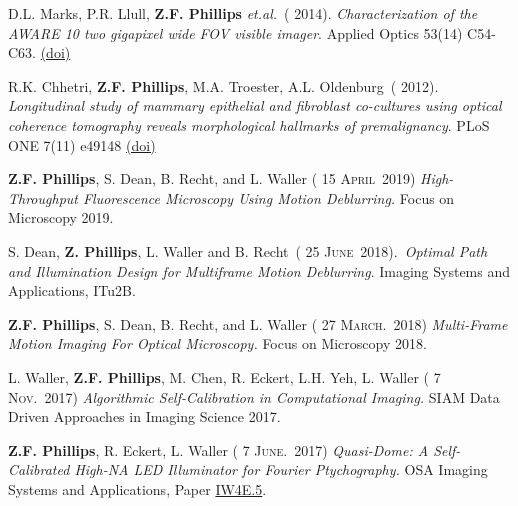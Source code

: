 \documentclass[12pt,letterpaper]{article}
\newcommand{\mhead}[1]{\leavevmode\marginpar{\sffamily\footnotesize #1}}
\renewcommand{\date}[1]{{} #1}
\begin{document}
\medskip
\par D.L. Marks, P.R. Llull, \textbf{Z.F. Phillips} \textit{et.al.}~(\date{2014}).
\emph{Characterization of the AWARE 10 two gigapixel wide FOV visible imager}.
Applied Optics 53(14) C54-C63.  \href{https://www.osapublishing.org/ao/abstract.cfm?uri=ao-53-13-C54}{(doi)}

\medskip
R.K. Chhetri, \textbf{Z.F. Phillips}, M.A. Troester, A.L. Oldenburg~(\date{2012}).
\emph{Longitudinal study of mammary \linebreak epithelial and fibroblast co-cultures using optical coherence tomography reveals morphological  \linebreak hallmarks of premalignancy}.
PLoS ONE 7(11) e49148  \href{http://journals.plos.org/plosone/article?id=10.1371/journal.pone.0049148}{(doi)}

\medskip

\medskip
\mhead{Conference Presentations}%

\par\vspace{-\baselineskip}

\textbf{Z.F. Phillips}, S. Dean, B. Recht, and L. Waller (\date{15 \textsc{April}~2019})
\emph{High-Throughput Fluorescence  \linebreak Microscopy Using Motion Deblurring.} Focus on Microscopy 2019.
\medskip

S. Dean, \textbf{Z. Phillips}, L. Waller and B. Recht~(\date{25 \textsc{June}~2018}).~\emph{Optimal Path and Illumination Design for Multiframe Motion Deblurring}.
Imaging Systems and Applications, ITu2B.
\medskip

\textbf{Z.F. Phillips}, S. Dean, B. Recht, and L. Waller (\date{27 \textsc{March.}~2018})
\emph{Multi-Frame Motion Imaging For  \linebreak Optical Microscopy.} Focus on Microscopy 2018.
\medskip

L. Waller, \textbf{Z.F. Phillips}, M. Chen, R. Eckert, L.H. Yeh, L. Waller (\date{7 \textsc{Nov.}~2017})
\emph{Algorithmic  \linebreak Self-Calibration in Computational Imaging.} SIAM Data Driven Approaches in Imaging Science 2017.

\textbf{Z.F. Phillips}, R. Eckert, L. Waller (\date{7 \textsc{June.}~2017})
\emph{Quasi-Dome: A Self-Calibrated High-NA LED  \linebreak Illuminator for Fourier Ptychography.} OSA Imaging Systems and Applications, Paper \href{https://www.osapublishing.org/abstract.cfm?uri=COSI-2016-CT1D.4}{IW4E.5}.
\medskip
\end{document}
